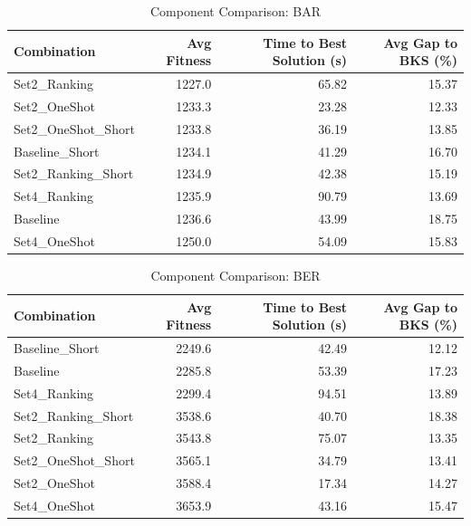 \documentclass{article}
\begin{document}
\begin{table}[htbp]
\centering
\caption{Component Comparison: BAR}
\label{tab:comparison_bar}
\begin{tabular}{lrrr}
\toprule
Combination & Avg Fitness & Time to Best Solution (s) & Avg Gap to BKS (\%) \\
\midrule
Set2\_Ranking & 1227.0 & 65.82 & 15.37 \\
Set2\_OneShot & 1233.3 & 23.28 & 12.33 \\
Set2\_OneShot\_Short & 1233.8 & 36.19 & 13.85 \\
Baseline\_Short & 1234.1 & 41.29 & 16.70 \\
Set2\_Ranking\_Short & 1234.9 & 42.38 & 15.19 \\
Set4\_Ranking & 1235.9 & 90.79 & 13.69 \\
Baseline & 1236.6 & 43.99 & 18.75 \\
Set4\_OneShot & 1250.0 & 54.09 & 15.83 \\
\bottomrule
\end{tabular}
\end{table}

\begin{table}[htbp]
\centering
\caption{Component Comparison: BER}
\label{tab:comparison_ber}
\begin{tabular}{lrrr}
\toprule
Combination & Avg Fitness & Time to Best Solution (s) & Avg Gap to BKS (\%) \\
\midrule
Baseline\_Short & 2249.6 & 42.49 & 12.12 \\
Baseline & 2285.8 & 53.39 & 17.23 \\
Set4\_Ranking & 2299.4 & 94.51 & 13.89 \\
Set2\_Ranking\_Short & 3538.6 & 40.70 & 18.38 \\
Set2\_Ranking & 3543.8 & 75.07 & 13.35 \\
Set2\_OneShot\_Short & 3565.1 & 34.79 & 13.41 \\
Set2\_OneShot & 3588.4 & 17.34 & 14.27 \\
Set4\_OneShot & 3653.9 & 43.16 & 15.47 \\
\bottomrule
\end{tabular}
\end{table}
\end{document}

